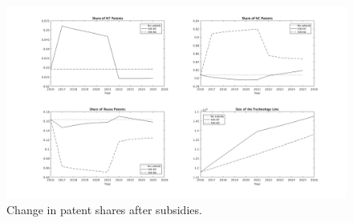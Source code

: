 \documentclass[serif]{article}
\theoremstyle{definition}
\begin{document}
\begin{figure}[h!]
\centering
\includegraphics[width=\textwidth]{figures/5_years/patent_subs.png}
\caption{Change in patent shares after subsidies.}
\end{figure}
\end{document}
